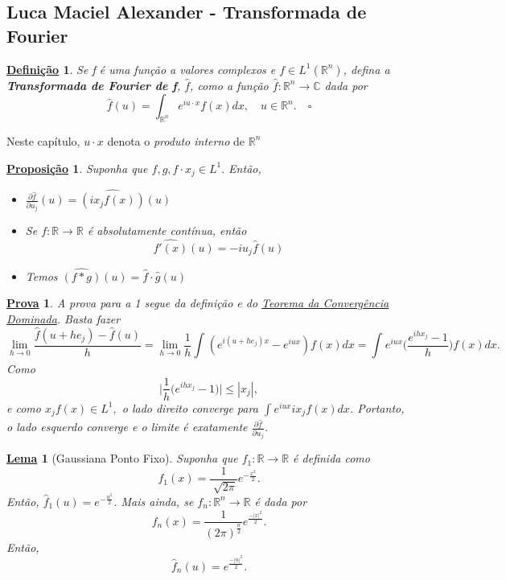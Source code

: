 \documentclass{article}
\newtheorem*{def*}{\underline{Defini\c c\~ao}}
\newtheorem*{lemma*}{\underline{Lema}}
\newtheorem*{prop*}{\underline{Proposi\c c\~ao}}
\newtheorem*{proof*}{\underline{Prova}}
\begin{document}
\subsection{Luca Maciel Alexander - Transformada de Fourier}  
 \begin{def*}
   Se f é uma função a valores complexos e \(f\in L^{1}(\mathbb{R}^{n})\), defina a \textbf{Transformada de Fourier de f}, \(\hat{f}\), como a função \(\hat{f}:\mathbb{R}^{n}\rightarrow \mathbb{C}\) dada por 
     \[
       \hat{f}(u) = \int_{\mathbb{R}^{n}}^{}e^{iu \cdot x}f(x)dx,\quad u\in \mathbb{R}^{n}.\quad \square
     \]
 \end{def*}
  Neste capítulo, \(u \cdot x\) denota o \textit{produto interno} de \(\mathbb{R}^{n}\)
 \begin{prop*}
   Suponha que \(f, g, f \cdot x_{j}\in L^{1}.\) Então,
  \begin{itemize}
    \item[1)] \(\frac{\partial \hat{f}}{\partial u_{j}}(u) = \widehat{(ix_{j}f(x))}(u)\)
      \item[2)] Se \(f:\mathbb{R}\rightarrow \mathbb{R}\) é absolutamente contínua, então 
        \[
          \hat{f'(x)}(u) = -iu_{j}\hat{f}(u)
        \]
      \item[3)] Temos \(\widehat{(f*g)}(u) = \hat{f}\cdot \hat{g}(u)\)
  \end{itemize}
 \end{prop*}
\begin{proof*}
  A prova para a 1 segue da definição e do \hyperlink{dominated_convergence}{\textit{Teorema da Convergência Dominada}}. Basta fazer 
    \[
      \lim_{h\to 0}\frac{\hat{f}(u+he_{j}) - \hat{f}(u)}{h} = \lim_{h\to 0} \frac{1}{h}\int_{}^{}(e^{i(u+he_{j})x}-e^{iux})f(x)dx = \int_{}^{}e^{iux}\biggl(\frac{e^{ihx_{j}} -1}{h}\biggr)f(x)dx.
    \]
  Como 
    \[
      \biggl\vert \frac{1}{h}\biggl(e^{ihx_{j}}-1\biggr) \biggr\vert\leq |x_{j}|,
    \]
  e como \(x_{j}f(x)\in L^{1},\) o lado direito converge para \(\int_{}^{}e^{iux}ix_{j}f(x)dx\). Portanto, o lado esquerdo converge e o limite é exatamente \(\frac{\partial \hat{f}}{\partial u_{j}}\).
\end{proof*}
\begin{lemma*}[Gaussiana Ponto Fixo]
  Suponha que \(f_1:\mathbb{R}\rightarrow \mathbb{R}\) é definida como 
    \[
      f_1(x) = \frac{1}{\sqrt[]{2\pi }}e^{-\frac{x^{2}}{2}}.
    \]
  Então, \(\hat{f}_{1}(u) = e^{-\frac{u^{2}}{2}}\).
  Mais ainda, se \(f_{n}:\mathbb{R}^{n}\rightarrow \mathbb{R}\) é dada por 
    \[
      f_{n}(x) = \frac{1}{(2\pi )^{\frac{n}{2}}}e^{\frac{-|x|^{2}}{2}}.
    \]
  Então, 
    \[
      \hat{f}_{n}(u) = e^{\frac{-|u|^{2}}{2}}.
    \]
\end{lemma*}
\end{document}
